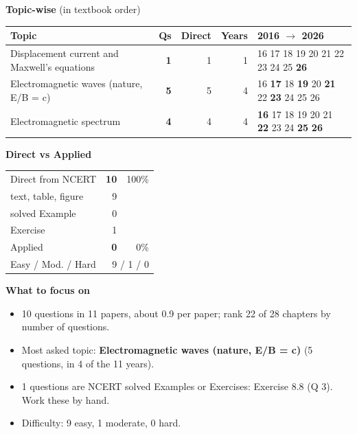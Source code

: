 {\small\textbf{\color{crimson}Topic-wise} (in textbook order)\par\smallskip
\begin{tabularx}{\linewidth}{@{}>{\raggedright\arraybackslash}Xrrrl@{}}\toprule
Topic & Qs & Direct & Years & 2016 $\rightarrow$ 2026\\\midrule
Displacement current and Maxwell's equations & \textbf{1} & 1 & 1 & {\scriptsize {\color{gray!45}16} {\color{gray!45}17} {\color{gray!45}18} {\color{gray!45}19} {\color{gray!45}20} {\color{gray!45}21} {\color{gray!45}22} {\color{gray!45}23} {\color{gray!45}24} {\color{gray!45}25} \textbf{26}}\\
Electromagnetic waves (nature, E/B = c) & \textbf{5} & 5 & 4 & {\scriptsize {\color{gray!45}16} \textbf{17} {\color{gray!45}18} \textbf{19} {\color{gray!45}20} \textbf{21} {\color{gray!45}22} \textbf{23} {\color{gray!45}24} {\color{gray!45}25} {\color{gray!45}26}}\\
Electromagnetic spectrum & \textbf{4} & 4 & 4 & {\scriptsize \textbf{16} {\color{gray!45}17} {\color{gray!45}18} {\color{gray!45}19} {\color{gray!45}20} {\color{gray!45}21} \textbf{22} {\color{gray!45}23} {\color{gray!45}24} \textbf{25} \textbf{26}}\\
\bottomrule\end{tabularx}}\par\medskip
\begin{minipage}[t]{0.34\linewidth}{\small\textbf{\color{crimson}Direct vs Applied}\par\smallskip
\begin{tabular}{@{}lrr@{}}\toprule
Direct from NCERT & \textbf{10} & 100\%\\
\quad text, table, figure & 9 &\\
\quad solved Example & 0 &\\
\quad Exercise & 1 &\\
Applied & \textbf{0} & 0\%\\\midrule
Easy / Mod. / Hard & \multicolumn{2}{r}{9 / 1 / 0}\\\bottomrule
\end{tabular}}\end{minipage}\hfill
\begin{minipage}[t]{0.63\linewidth}{\small\textbf{\color{crimson}What to focus on}\par\smallskip
\begin{itemize}[leftmargin=1.1em,itemsep=1pt,topsep=0pt]
\item 10 questions in 11 papers, about 0.9 per paper; rank 22 of 28 chapters by number of questions.
\item Most asked topic: \textbf{Electromagnetic waves (nature, E/B = c)} (5 questions, in 4 of the 11 years).
\item 1 questions are NCERT solved Examples or Exercises: Exercise 8.8 (Q 3). Work these by hand.
\item Difficulty: 9 easy, 1 moderate, 0 hard.
\end{itemize}}\end{minipage}\par
